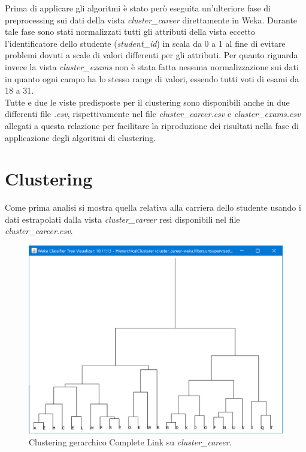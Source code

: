 \documentclass[]{article}
\begin{document}
Prima di applicare gli algoritmi \`{e} stato per\`{o} eseguita un'ulteriore fase di preprocessing sui dati della vista \textit{cluster\_career} direttamente in Weka. Durante tale fase sono stati normalizzati tutti gli attributi della vista eccetto l'identificatore dello studente (\textit{student\_id}) in scala da 0 a 1 al fine di evitare problemi dovuti a scale di valori differenti per gli attributi. Per quanto riguarda invece la vista \textit{cluster\_exams} non \`{e} stata fatta nessuna normalizzazione sui dati in quanto ogni campo ha lo stesso range di valori, essendo tutti voti di esami da 18 a 31.\\

Tutte e due le viste predisposte per il clustering sono disponibili anche in due differenti file \textit{.csv}, rispettivamente nel file \textit{cluster\_career.csv} e \textit{cluster\_exams.csv} allegati a questa relazione per facilitare la riproduzione dei risultati nella fase di applicazione degli algoritmi di clustering.

\section{Clustering}
Come prima analisi si mostra quella relativa alla carriera dello studente usando i dati estrapolati dalla vista \textit{cluster\_career} resi disponibili nel file \textit{cluster\_career.csv}.\\

\begin{figure}[!]
	\centering
	\includegraphics[scale=0.6]{Img/clustering_gerarchico_career_complete.png}
	\caption{Clustering gerarchico Complete Link su \textit{cluster\_career}.
		\label{fig:3}}
\end{figure} 
\end{document}
